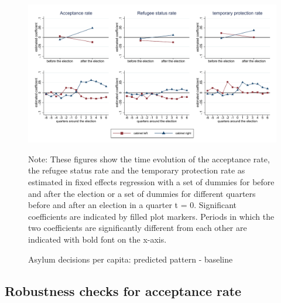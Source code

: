 \documentclass[11pt,a4paper]{scrartcl}
\begin{document}
\clearpage
\FloatBarrier
\begin{figure}[!ht]
	
	\caption{Asylum decisions per capita: predicted pattern - baseline}
	\centering
	\begin{minipage}{1\textwidth} 
		\includegraphics[width=\linewidth]{../results/decisions/dec_graphs_baseline.pdf}
		{\scriptsize Note: These figures show the time evolution of the acceptance rate, the refugee status rate and the temporary protection rate as estimated in fixed effects regression with a set of dummies for before and after the election or a set of dummies for different quarters before and after an election in a quarter t = 0. Significant coefficients are indicated by filled plot markers. Periods in which the two coefficients are significantly different from each other are indicated with bold font on the x-axis. \par}
	\end{minipage}
\end{figure}






\clearpage
\FloatBarrier
\subsection{Robustness checks for acceptance rate}


\end{document}
